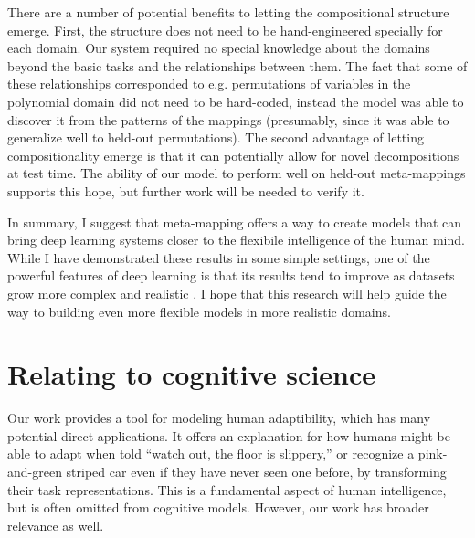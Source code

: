 There are a number of potential benefits to letting the compositional structure emerge. First, the structure does not need to be hand-engineered specially for each domain. Our system required no special knowledge about the domains beyond the basic tasks and the relationships between them. The fact that some of these relationships corresponded to e.g. permutations of variables in the polynomial domain did not need to be hard-coded, instead the model was able to discover it from the patterns of the mappings (presumably, since it was able to generalize well to held-out permutations). The second advantage of letting compositionality emerge is that it can potentially allow for novel decompositions at test time. The ability of our model to perform well on held-out meta-mappings supports this hope, but further work will be needed to verify it. \par

In summary, I suggest that meta-mapping offers a way to create models that can bring deep learning systems closer to the flexibile intelligence of the human mind. While I have demonstrated these results in some simple settings, one of the powerful features of deep learning is that its results tend to improve as datasets grow more complex and realistic \citep{Hill2019a,Radford2019,Sutton2019}. I hope that this research will help guide the way to building even more flexible models in more realistic domains.  \par

\section{Relating to cognitive science}

Our work provides a tool for modeling human adaptibility, which has many potential direct applications. It offers an explanation for how humans might be able to adapt when told ``watch out, the floor is slippery,'' or recognize a pink-and-green striped car even if they have never seen one before, by transforming their task representations. This is a fundamental aspect of human intelligence, but is often omitted from cognitive models. However, our work has broader relevance as well. \par 

